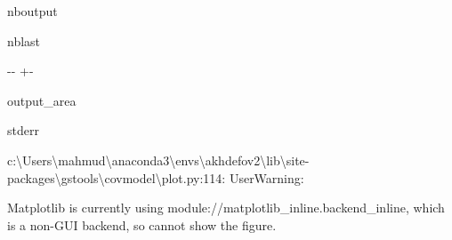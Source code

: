 \documentclass[letterpaper,10pt,english]{sphinxmanual}
\begin{document}
\begin{sphinxuseclass}{nboutput}
\begin{sphinxuseclass}{nblast}
{

\kern-\sphinxverbatimsmallskipamount\kern-\baselineskip
\kern+\FrameHeightAdjust\kern-\fboxrule
\vspace{\nbsphinxcodecellspacing}

\begin{sphinxuseclass}{output_area}
\begin{sphinxuseclass}{stderr}


\begin{sphinxVerbatim}[commandchars=\\\{\}]
c:\textbackslash{}Users\textbackslash{}mahmud\textbackslash{}anaconda3\textbackslash{}envs\textbackslash{}akhdefov2\textbackslash{}lib\textbackslash{}site-packages\textbackslash{}gstools\textbackslash{}covmodel\textbackslash{}plot.py:114: UserWarning:

Matplotlib is currently using module://matplotlib\_inline.backend\_inline, which is a non-GUI backend, so cannot show the figure.

\end{sphinxVerbatim}



\end{sphinxuseclass}
\end{sphinxuseclass}
}

\end{sphinxuseclass}
\end{sphinxuseclass}
\end{document}
